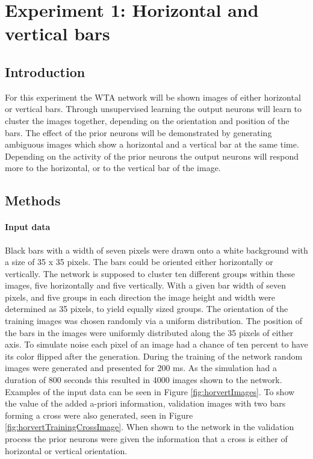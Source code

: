 \section{Experiment 1: Horizontal and vertical bars}
\label{section:horvertAdaptiveInhibition}

\subsection{Introduction}

For this experiment the WTA network will be shown images of either horizontal or vertical bars. Through unsupervised learning the output neurons will learn to cluster the images together, depending on the orientation and position of the bars. 
The effect of the prior neurons will be demonstrated by generating ambiguous images which show a horizontal and a vertical bar at the same time. Depending on the activity of the prior neurons the output neurons will respond more to the horizontal, or to the vertical bar of the image. 

\subsection{Methods}

\paragraph{Input data}
Black bars with a width of seven pixels were drawn onto a white background with a size of 35 x 35 pixels. The bars could be oriented either horizontally or vertically. The network is supposed to cluster ten different groups within these images, five horizontally and five vertically. With a given bar width of seven pixels, and five groups in each direction the image height and width were determined as 35 pixels, to yield equally sized groups. The orientation of the training images was chosen randomly via a uniform distribution. The position of the bars in the images were uniformly distributed along the 35 pixels of either axis. To simulate noise each pixel of an image had a chance of ten percent to have its color flipped after the generation.
During the training of the network random images were generated and presented for 200 ms. As the simulation had a duration of 800 seconds this resulted in 4000 images shown to the network. Examples of the input data can be seen in Figure \ref{fig:horvertImages}. To show the value of the added a-priori information, validation images with two bars forming a cross were also generated, seen in Figure \ref{fig:horvertTrainingCrossImage}. When shown to the network in the validation process the prior neurons were given the information that a cross is either of horizontal or vertical orientation.

